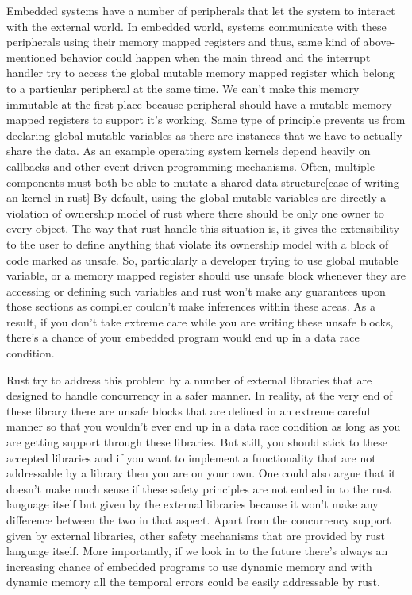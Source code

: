 Embedded systems have a number of peripherals that let the system to interact with the external world. In embedded world, systems communicate with these peripherals using their memory mapped registers and thus, same kind of above-mentioned behavior could happen when the main thread and the interrupt handler try to access the global mutable memory mapped register which belong to a particular peripheral at the same time. We can’t make this memory immutable at the first place because peripheral should have a mutable memory mapped registers to support it’s working. Same type of principle prevents us from declaring global mutable variables as there are instances that we have to actually share the data. As an example operating system kernels depend heavily on callbacks and other event-driven programming mechanisms. Often, multiple components must both be able to mutate a shared data structure[case of writing an kernel in rust]
By default, using the global mutable variables are directly a violation of ownership model of rust where there should be only one owner to every object. The way that rust handle this situation is, it gives the extensibility to the user to define anything that violate its ownership model with a block of code marked as unsafe. So, particularly a developer trying to use global mutable variable, or a memory mapped register should use unsafe block whenever they are accessing or defining such variables and rust won't make any guarantees upon those sections as compiler couldn't make inferences within these areas. As a result, if you don’t take extreme care while you are writing these unsafe blocks, there's a chance of your embedded program would end up in a data race condition. 

Rust try to address this problem by a number of external libraries that are designed to handle concurrency in a safer manner. In reality, at the very end of these library there are unsafe blocks that are defined in an extreme careful manner so that you wouldn't ever end up in a data race condition as long as you are getting support through these libraries. But still, you should stick to these accepted libraries and if you want to implement a functionality that are not addressable by a library then you are on your own. One could also argue that it doesn't make much sense if these safety principles are not embed in to the rust language itself but given by the external libraries because it won’t make any difference between the two in that aspect. Apart from the concurrency support given by external libraries, other safety mechanisms that are provided by rust language itself. More importantly, if we look in to the future there’s always an increasing chance of embedded programs to use dynamic memory and with dynamic memory all the temporal errors could be easily addressable by rust. 

